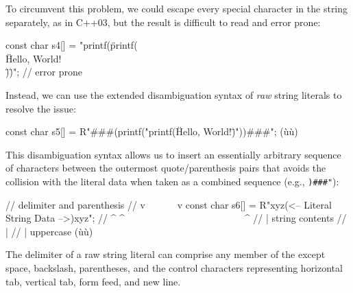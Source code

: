 \noindent To circumvent this problem, we could escape every special character in
the string separately, as in C++03, but the result is difficult to read
and error prone:

\begin{emcppslisting}
const char s4[] = "printf(\"printf(\\\"Hello, World!\\\")\")";  // error prone
\end{emcppslisting}
    
\noindent Instead, we can use the extended disambiguation syntax of \emph{raw}
string literals to resolve the issue:

\begin{emcppslisting}
const char s5[] = R"###(printf("printf(\"Hello, World!\")"))###";  (ù{}ù)
\end{emcppslisting}

    
\noindent This disambiguation syntax allows us to insert an essentially
arbitrary sequence of
characters between the outermost quote/parenthesis pairs that avoids the
collision with the literal data when taken as a combined sequence (e.g.,
\lstinline!)###"!):

\begin{emcppslisting}
//                       delimiter and parenthesis
//                  v~~~                           ~~~v
const char s6[] = R"xyz(<-- Literal String Data -->)xyz";
//                ^     ^~~~~~~~~~~~~~~~~~~~~~~~~~^
//                |          string contents
//                |
//                | uppercase (ù{}ù)
\end{emcppslisting}
    
\noindent The delimiter of a raw string literal can
comprise any member of the  except
space, backslash, parentheses, and the control characters representing
  horizontal tab, vertical tab, form feed, and new line.

